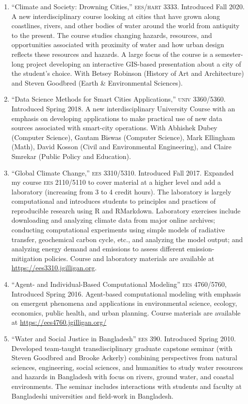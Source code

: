 %
%
\begin{enumerate}
\item ``Climate and Society: Drowning Cities,'' \textsc{ees/hart 3333}. Introduced Fall 2020. A new interdisciplinary course looking at cities that have grown along coastlines, rivers, and other bodies of water around the world from antiquity to the present. The course studies changing hazards, resources, and opportunities associated with proximity of water and how urban design reflects these resources and hazards. A large focus of the course is a semester-long project developing an interactive GIS-based presentation about a city of the student's choice. With Betsey Robinson (History of Art and Architecture) and Steven Goodbred (Earth \& Environmental Sciences).
\item ``Data Science Methods for Smart Cities Applications,'' \textsc{univ 3360/5360}. Introduced Spring 2018. A new interdisciplinary University Course with an emphasis on developing applications to make practical use of new data sources associated with smart-city operations. With Abhishek Dubey (Computer Science), Gautam Biswas (Computer Science), Mark Ellingham (Math), David Kosson (Civil and Environmental Engineering), and Claire Smrekar (Public Policy and Education).
\item ``Global Climate Change,'' \textsc{ees 3310/5310}. Introduced Fall 2017. Expanded my course \textsc{ees 2110/5110} to cover material at a higher level and add a laboratory (increasing from 3 to 4 credit hours).
The laboratory is largely computational and introduces students to principles and practices of reproducible research using R and RMarkdown. Laboratory exercises include downloading and analyzing climate data
from major online archives; conducting computational experiments using simple models of radiative transfer, geochemical carbon cycle, etc., and analyzing the model output; and analyzing energy demand and  emissions to assess different emission-mitigation policies. Course and laboratory materials are available at \url{https://ees3310.jgilligan.org}.
\item ``Agent- and Individual-Based Computational Modeling'' \textsc{ees 4760/5760}, Introduced Spring 2016. Agent-based computational modeling with emphasis on emergent phenomena and applications in environmental science, ecology, economics, public health, and urban planning. Course materials are available at \url{https://ees4760.jgilligan.org/}
\item ``Water and Social Justice in Bangladesh'' \textsc{ees 390}. Introduced Spring 2010. Developed team-taught transdisciplinary graduate capstone seminar (with Steven Goodbred and Brooke Ackerly) combining perspectives from natural sciences, engineering, social sciences, and humanities to study water resources and hazards in Bangladesh with focus on rivers, ground water, and coastal environments. The seminar includes interactions with students and faculty at Bangladeshi universities and field-work in Bangladesh.

\end{enumerate}
